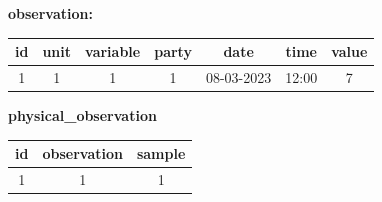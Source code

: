 \documentclass{exam}
\begin{document}
\begin{questions}
\begin{parts}
		\begin{center}
			\textbf{observation:}

			\begin{tabular}{ | c | c | c | c | c | c | c |}
				\hline
				id & unit & variable & party & date       & time  & value \\
				\hline
				1  & 1    & 1        & 1     & 08-03-2023 & 12:00 & 7     \\
				\hline
			\end{tabular}

			\textbf{physical\_observation}

			\begin{tabular}{ | c | c | c | }
				\hline
				id & observation & sample \\
				\hline
				1  & 1           & 1      \\
				\hline
			\end{tabular}
		\end{center}
	\end{parts}
	\pagebreak
\end{questions}
\end{document}
